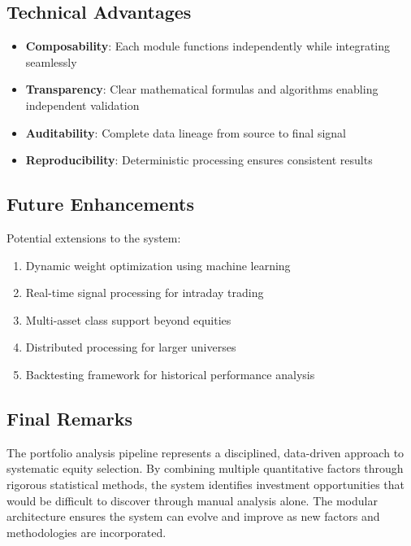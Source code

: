 \documentclass[11pt, a4paper, twoside]{article}
\begin{document}
\subsection{Technical Advantages}

\begin{itemize}
    \item \textbf{Composability}: Each module functions independently while integrating seamlessly
    \item \textbf{Transparency}: Clear mathematical formulas and algorithms enabling independent validation
    \item \textbf{Auditability}: Complete data lineage from source to final signal
    \item \textbf{Reproducibility}: Deterministic processing ensures consistent results
\end{itemize}

\subsection{Future Enhancements}

Potential extensions to the system:

\begin{enumerate}
    \item Dynamic weight optimization using machine learning
    \item Real-time signal processing for intraday trading
    \item Multi-asset class support beyond equities
    \item Distributed processing for larger universes
    \item Backtesting framework for historical performance analysis
\end{enumerate}

\subsection{Final Remarks}

The portfolio analysis pipeline represents a disciplined, data-driven approach to systematic equity selection. By combining multiple quantitative factors through rigorous statistical methods, the system identifies investment opportunities that would be difficult to discover through manual analysis alone. The modular architecture ensures the system can evolve and improve as new factors and methodologies are incorporated.

\end{document}
